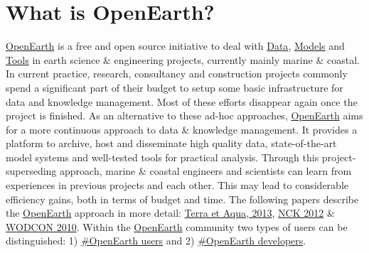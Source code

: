 \documentclass[a4paper, twocolumn, 12pt]{article}
\begin{document}
 

\section*{What is OpenEarth?}
\href{http://www.openearth.eu}{OpenEarth} is a free and open source initiative to deal with \href{https://publicwiki.deltares.nl/display/OET/Data}{Data}, \href{https://publicwiki.deltares.nl/display/OET/Models}{Models} and \href{https://publicwiki.deltares.nl/display/OET/Tools}{Tools} in earth science \& engineering projects, currently mainly marine \& coastal. In current practice, research, consultancy and construction projects commonly spend a significant part of their budget to setup some basic infrastructure for data and knowledge management. Most of these efforts disappear again once the project is finished. As an alternative to these ad-hoc approaches, \href{http://www.openearth.eu}{OpenEarth} aims for a more continuous approach to data \& knowledge management. It provides a platform to archive, host and disseminate high quality data, state-of-the-art model systems and well-tested tools for practical analysis. Through this project-superseding approach, marine \& coastal engineers and scientists can learn from experiences in previous projects and each other. This may lead to considerable efficiency gains, both in terms of budget and time. The following papers describe the \href{http://www.openearth.eu}{OpenEarth} approach in more detail: \href{https://www.iadc-dredging.com/ul/cms/terraetaqua/document/3/7/3/373/373/1/article-openeartha-knowledge-management-workflow-for-dredging-projects-terra-et-aqua-131-1.pdf}{Terra et Aqua, 2013}, \href{http://dx.doi.org/10.3990/2.177}{NCK 2012} \& \href{https://publicwiki.deltares.nl/download/attachments/42401895/VanKoningsveld\%20et\%20al.\%20\%28WODCON2010\%29\%20Data\%20\%20Models\%20and\%20Tools\%20-\%20V17.pdf?version=1&modificationDate=1287560844000&api=v2}{WODCON 2010}.
Within the \href{http://www.openearth.eu}{OpenEarth} community two types of users can be distinguished: 1) \href{https://publicwiki.deltares.nl/display/OET/OpenEarth#OpenEarth-OpenEarthusers}{\#OpenEarth users} and 2) \href{https://publicwiki.deltares.nl/display/OET/OpenEarth#OpenEarth-OpenEarthdevelopers}{\#OpenEarth developers}.
\end{document}
